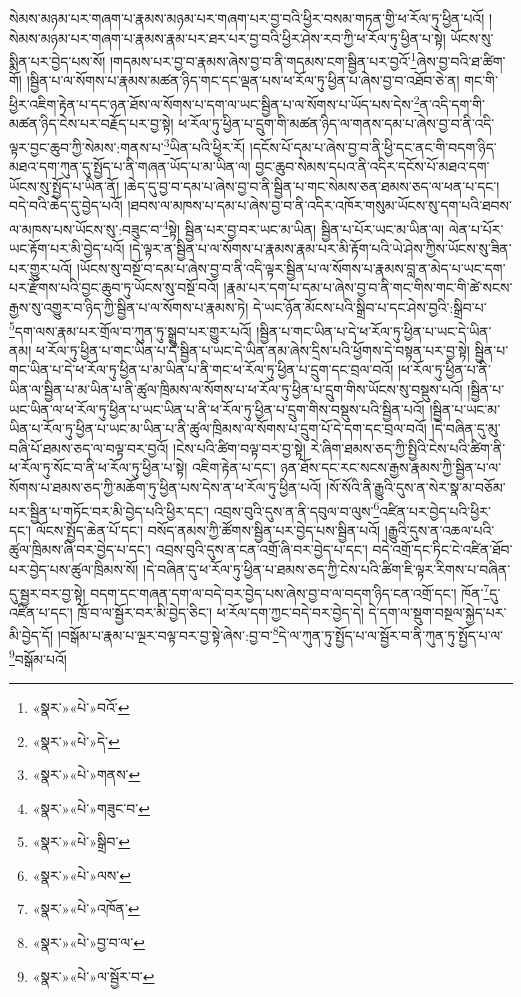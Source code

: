 སེམས་མཉམ་པར་གཞག་པ་རྣམས་མཉམ་པར་གཞག་པར་བྱ་བའི་ཕྱིར་བསམ་གཏན་གྱི་ཕ་རོལ་ཏུ་ཕྱིན་པའོ། །སེམས་མཉམ་པར་གཞག་པ་རྣམས་རྣམ་པར་ཐར་པར་བྱ་བའི་ཕྱིར་ཤེས་རབ་ཀྱི་ཕ་རོལ་ཏུ་ཕྱིན་པ་སྟེ། ཡོངས་སུ་སྨིན་པར་བྱེད་པས་སོ། །གདམས་པར་བྱ་བ་རྣམས་ཞེས་བྱ་བ་ནི་གདམས་ངག་སྦྱིན་པར་བྱའོ་\footnote{«སྣར་»«པེ་»བའོ་}ཞེས་བྱ་བའི་ཐ་ཚིག་གོ། །སྦྱིན་པ་ལ་སོགས་པ་རྣམས་མཚན་ཉིད་གང་དང་ལྡན་པས་ཕ་རོལ་ཏུ་ཕྱིན་པ་ཞེས་བྱ་བ་འཐོབ་ཅེ་ན། གང་གི་ཕྱིར་འཇིག་རྟེན་པ་དང་ཉན་ཐོས་ལ་སོགས་པ་དག་ལ་ཡང་སྦྱིན་པ་ལ་སོགས་པ་ཡོད་པས་དེས་\footnote{«སྣར་»«པེ་»དེ་}ན་འདི་དག་གི་མཚན་ཉིད་ངེས་པར་བརྗོད་པར་བྱ་སྟེ། ཕ་རོལ་ཏུ་ཕྱིན་པ་དྲུག་གི་མཚན་ཉིད་ལ་གནས་དམ་པ་ཞེས་བྱ་བ་ནི་འདི་ལྟར་བྱང་ཆུབ་ཀྱི་སེམས་:གནས་པ་\footnote{«སྣར་»«པེ་»གནས་}ཡིན་པའི་ཕྱིར་རོ། །དངོས་པོ་དམ་པ་ཞེས་བྱ་བ་ནི་ཕྱི་དང་ནང་གི་བདག་ཉིད་མཐའ་དག་ཀུན་དུ་སྤྱོད་པ་ནི་གཞན་ཡོད་པ་མ་ཡིན་ལ། བྱང་ཆུབ་སེམས་དཔའ་ནི་འདིར་དངོས་པོ་མཐའ་དག་ཡོངས་སུ་སྤྱོད་པ་ཡིན་ནོ། །ཆེད་དུ་བྱ་བ་དམ་པ་ཞེས་བྱ་བ་ནི་སྦྱིན་པ་གང་སེམས་ཅན་ཐམས་ཅད་ལ་ཕན་པ་དང་། བདེ་བའི་ཆེད་དུ་བྱེད་པའོ། །ཐབས་ལ་མཁས་པ་དམ་པ་ཞེས་བྱ་བ་ནི་འདིར་འཁོར་གསུམ་ཡོངས་སུ་དག་པའི་ཐབས་ལ་མཁས་པས་ཡོངས་སུ་:བཟུང་བ་\footnote{«སྣར་»«པེ་»གཟུང་བ་}སྟེ། སྦྱིན་པར་བྱ་བར་ཡང་མ་ཡིན། སྦྱིན་པ་པོར་ཡང་མ་ཡིན་ལ། ལེན་པ་པོར་ཡང་རྟོག་པར་མི་བྱེད་པའོ། །དེ་ལྟར་ན་སྦྱིན་པ་ལ་སོགས་པ་རྣམས་རྣམ་པར་མི་རྟོག་པའི་ཡེ་ཤེས་ཀྱིས་ཡོངས་སུ་ཟིན་པར་གྱུར་པའོ། །ཡོངས་སུ་བསྔོ་བ་དམ་པ་ཞེས་བྱ་བ་ནི་འདི་ལྟར་སྦྱིན་པ་ལ་སོགས་པ་རྣམས་བླ་ན་མེད་པ་ཡང་དག་པར་རྫོགས་པའི་བྱང་ཆུབ་ཏུ་ཡོངས་སུ་བསྔོ་བའོ། །རྣམ་པར་དག་པ་དམ་པ་ཞེས་བྱ་བ་ནི་གང་གིས་གང་གི་ཚེ་སངས་རྒྱས་སུ་འགྱུར་བ་ཉིད་ཀྱི་སྦྱིན་པ་ལ་སོགས་པ་རྣམས་ཏེ། དེ་ཡང་ཉོན་མོངས་པའི་སྒྲིབ་པ་དང་ཤེས་བྱའི་:སྒྲིབ་པ་\footnote{«སྣར་»«པེ་»སྒྲིབ་}དག་ལས་རྣམ་པར་གྲོལ་བ་ཀུན་ཏུ་སྒྲུབ་པར་གྱུར་པའོ། །སྦྱིན་པ་གང་ཡིན་པ་དེ་ཕ་རོལ་ཏུ་ཕྱིན་པ་ཡང་དེ་ཡིན་ནམ། ཕ་རོལ་ཏུ་ཕྱིན་པ་གང་ཡིན་པ་དེ་སྦྱིན་པ་ཡང་དེ་ཡིན་ནམ་ཞེས་དྲིས་པའི་ཕྱོགས་དེ་བསྟན་པར་བྱ་སྟེ། སྦྱིན་པ་གང་ཡིན་པ་དེ་ཕ་རོལ་ཏུ་ཕྱིན་པ་མ་ཡིན་པ་ནི་གང་ཕ་རོལ་ཏུ་ཕྱིན་པ་དྲུག་དང་བྲལ་བའོ། །ཕ་རོལ་ཏུ་ཕྱིན་པ་ནི་ཡིན་ལ་སྦྱིན་པ་མ་ཡིན་པ་ནི་ཚུལ་ཁྲིམས་ལ་སོགས་པ་ཕ་རོལ་ཏུ་ཕྱིན་པ་དྲུག་གིས་ཡོངས་སུ་བསྡུས་པའོ། །སྦྱིན་པ་ཡང་ཡིན་ལ་ཕ་རོལ་ཏུ་ཕྱིན་པ་ཡང་ཡིན་པ་ནི་ཕ་རོལ་ཏུ་ཕྱིན་པ་དྲུག་གིས་བསྡུས་པའི་སྦྱིན་པའོ། །སྦྱིན་པ་ཡང་མ་ཡིན་པ་རོལ་ཏུ་ཕྱིན་པ་ཡང་མ་ཡིན་པ་ནི་ཚུལ་ཁྲིམས་ལ་སོགས་པ་དྲུག་པོ་དེ་དག་དང་བྲལ་བའོ། །དེ་བཞིན་དུ་མུ་བཞི་པོ་ཐམས་ཅད་ལ་བལྟ་བར་བྱའོ། །ངེས་པའི་ཚིག་བལྟ་བར་བྱ་སྟེ། རེ་ཞིག་ཐམས་ཅད་ཀྱི་སྤྱིའི་ངེས་པའི་ཚིག་ནི་ཕ་རོལ་ཏུ་སོང་བ་ནི་ཕ་རོལ་ཏུ་ཕྱིན་པ་སྟེ། འཇིག་རྟེན་པ་དང་། ཉན་ཐོས་དང་རང་སངས་རྒྱས་རྣམས་ཀྱི་སྦྱིན་པ་ལ་སོགས་པ་ཐམས་ཅད་ཀྱི་མཆོག་ཏུ་ཕྱིན་པས་དེས་ན་ཕ་རོལ་ཏུ་ཕྱིན་པའོ། །སོ་སོའི་ནི་རྒྱུའི་དུས་ན་སེར་སྣ་མ་བཅོམ་པར་སྦྱིན་པ་གཏོང་བར་མི་བྱེད་པའི་ཕྱིར་དང་། འབྲས་བུའི་དུས་ན་ནི་དབུལ་བ་ལུས་\footnote{«སྣར་»«པེ་»ལས་}འཛིན་པར་བྱེད་པའི་ཕྱིར་དང་། ལོངས་སྤྱོད་ཆེན་པོ་དང་། བསོད་ནམས་ཀྱི་ཚོགས་སྦྱིན་པར་བྱེད་པས་སྦྱིན་པའོ། །རྒྱུའི་དུས་ན་འཆལ་པའི་ཚུལ་ཁྲིམས་ཞི་བར་བྱེད་པ་དང་། འབྲས་བུའི་དུས་ན་ངན་འགྲོ་ཞི་བར་བྱེད་པ་དང་། བདེ་འགྲོ་དང་ཏིང་ངེ་འཛིན་ཐོབ་པར་བྱེད་པས་ཚུལ་ཁྲིམས་སོ། །དེ་བཞིན་དུ་ཕ་རོལ་ཏུ་ཕྱིན་པ་ཐམས་ཅད་ཀྱི་ངེས་པའི་ཚིག་ཇི་ལྟར་རིགས་པ་བཞིན་དུ་སྦྱར་བར་བྱ་སྟེ། བདག་དང་གཞན་དག་ལ་བདེ་བར་བྱེད་པས་ཞེས་བྱ་བ་ལ་བདག་ཉིད་ངན་འགྲོ་དང་། ཁོན་\footnote{«སྣར་»«པེ་»འཁོན་}དུ་འཛིན་པ་དང་། ཁྲོ་བ་ལ་སྦྱོར་བར་མི་བྱེད་ཅིང་། ཕ་རོལ་དག་ཀྱང་བདེ་བར་བྱེད་དེ། དེ་དག་ལ་སྡུག་བསྔལ་སྐྱེད་པར་མི་བྱེད་དོ། །བསྒོམ་པ་རྣམ་པ་ལྔར་བལྟ་བར་བྱ་སྟེ་ཞེས་:བྱ་བ་\footnote{«སྣར་»«པེ་»བྱ་བ་ལ་}དེ་ལ་ཀུན་ཏུ་སྤྱོད་པ་ལ་སྦྱོར་བ་ནི་ཀུན་ཏུ་སྤྱོད་པ་ལ་\footnote{«སྣར་»«པེ་»ལ་སྦྱོར་བ་}བསྒོམ་པའོ། 